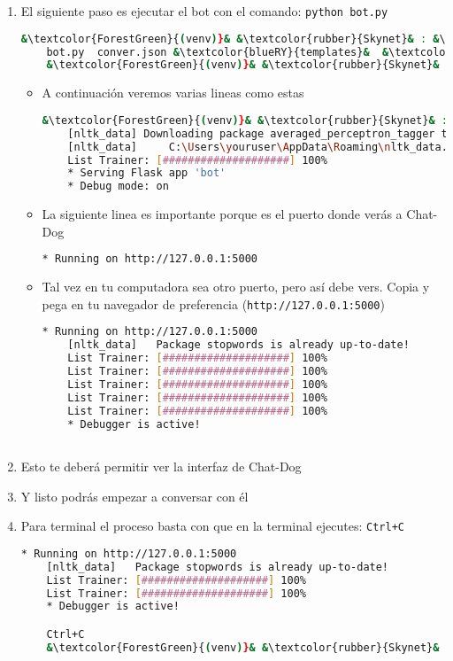\documentclass[a4paper,12pt]{article}
\begin{document}
\begin{enumerate}
\item El siguiente paso es ejecutar el bot con el comando: \texttt{python bot.py}
\begin{lstlisting}[language=bash]    
    &\textcolor{ForestGreen}{(venv)}& &\textcolor{rubber}{Skynet}& : &\textcolor{Meadow}{/src}& $ ls
    bot.py  conver.json &\textcolor{blueRY}{templates}&  &\textcolor{blueRY}{nenv}&
    &\textcolor{ForestGreen}{(venv)}& &\textcolor{rubber}{Skynet}& : &\textcolor{Meadow}{/src}& $ python bot.py
\end{lstlisting}
\begin{itemize}
    \item A continuación veremos varias lineas como estas
\begin{lstlisting}[language=bash]    
    &\textcolor{ForestGreen}{(venv)}& &\textcolor{rubber}{Skynet}& : &\textcolor{Meadow}{/src}& $ python bot.py
    [nltk_data] Downloading package averaged_perceptron_tagger to
    [nltk_data]     C:\Users\youruser\AppData\Roaming\nltk_data...
    List Trainer: [####################] 100%
    * Serving Flask app 'bot'
    * Debug mode: on    
\end{lstlisting}
    \item La siguiente linea es importante porque es el puerto donde verás a Chat-Dog
\begin{lstlisting}[language=bash]            
    * Running on http://127.0.0.1:5000
\end{lstlisting}
    \item Tal vez en tu computadora sea otro puerto, pero así debe vers. Copia y pega en tu navegador de preferencia (\texttt{http://127.0.0.1:5000})
\begin{lstlisting}[language=bash]        
    * Running on http://127.0.0.1:5000
    [nltk_data]   Package stopwords is already up-to-date!
    List Trainer: [####################] 100%
    List Trainer: [####################] 100%
    List Trainer: [####################] 100%
    List Trainer: [####################] 100%
    List Trainer: [####################] 100%
    * Debugger is active!



\end{lstlisting}
\end{itemize}

\item Esto te deberá permitir ver la interfaz de Chat-Dog
\item Y listo podrás empezar a conversar con él 
\item Para terminal el proceso basta con que en la terminal ejecutes: \texttt{Ctrl+C}
\begin{lstlisting}[language=bash]        
    * Running on http://127.0.0.1:5000
    [nltk_data]   Package stopwords is already up-to-date!
    List Trainer: [####################] 100%
    List Trainer: [####################] 100%
    * Debugger is active!

    Ctrl+C
    &\textcolor{ForestGreen}{(venv)}& &\textcolor{rubber}{Skynet}& : &\textcolor{Meadow}{/src}& $
\end{lstlisting}

\end{enumerate}
\end{document}
